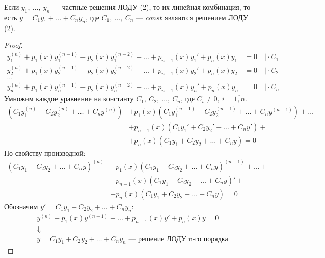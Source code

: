 \newpage
\begin{theorem*}
    Если $y_1,\ \ldots,\ y_n$ --- частные решения ЛОДУ (2), то их линейная комбинация, то есть $y = C_1y_1 + \ldots + C_ny_n$, где $C_1,\ \ldots,\ C_n$ --- $const$ являются решением ЛОДУ (2).
\end{theorem*}
\begin{proof}
    \begin{align*}
        y_1^{(n)} + p_1(x)y_1^{(n-1)}  + p_2(x)y_1^{(n-2)} + \ldots + p_{n-1}(x)y_1' + p_n(x)y_1 &= 0\quad \Big| \cdot C_1 \\ 
        y_2^{(n)} + p_1(x)y_2^{(n-1)}  + p_2(x)y_2^{(n-2)} + \ldots + p_{n-1}(x)y_2' + p_n(x)y_2 &= 0\quad \Big| \cdot C_2 \\
        \ldots \\
        y_n^{(n)} + p_1(x)y_n^{(n-1)}  + p_2(x)y_n^{(n-2)} + \ldots + p_{n-1}(x)y_n' + p_n(x)y_n &= 0\quad \Big| \cdot C_n
    \end{align*}
    Умножим каждое уравнение на константу $C_1,\ C_2,\ \ldots,\ C_n$, где $C_i \ne 0,\ i = \overline{1,n}$.
    \begin{align*}
        \left(C_1y_1^{(n)} + C_2y_2^{(n)} + \ldots + C_ny^{(n)}\right) &+ p_1(x)\left(C_1y_1^{(n-1)} + C_2y_2^{(n-1)} + \ldots + C_ny^{(n-1)}\right) + \ldots + \\
        &+ p_{n-1}(x) \left(C_1y_1' + C_2y_2' + \ldots + C_ny'\right) + \\
        &+ p_{n}(x) \left(C_1y_1 + C_2y_2 + \ldots + C_ny\right) = 0
    \end{align*}
    По свойству производной:
    \begin{align*}
        \left(C_1y_1 + C_2y_2 + \ldots + C_ny\right)^{(n)} &+ p_1(x)\left(C_1y_1 + C_2y_2 + \ldots + C_ny\right)^{(n-1)} + \ldots + \\
        &+ p_{n-1}(x) \left(C_1y_1 + C_2y_2 + \ldots + C_ny\right)' + \\
        &+ p_{n}(x) \left(C_1y_1 + C_2y_2 + \ldots + C_ny\right) = 0
    \end{align*}
    Обозначим $y' = C_1y_1 + C_2y_2 + \ldots + C_ny_n$:
    \begin{gather*}
        y^{(n)} + p_1(x) y^{(n-1)} + \ldots + p_{n-1} (x)y' + p_n(x) y = 0 \\
        \Downarrow \\
        y = C_1y_1 + C_2y_2 + \ldots + C_ny_n \text{ --- решение ЛОДУ n-го порядка}
    \end{gather*}
\end{proof}

